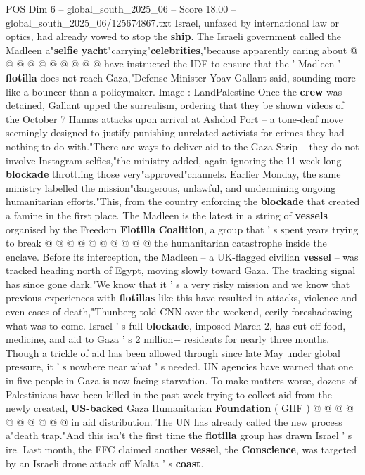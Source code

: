\begin{textsample}{POS Dim 6 – global\_south\_2025\_06 – Score 18.00 – global\_south\_2025\_06/125674867.txt}
Israel, unfazed by international law or optics, had already vowed to stop the \textbf{ship}.
The Israeli government called the Madleen a"\textbf{selfie} \textbf{yacht}"carrying"\textbf{celebrities},"because apparently caring about @ @ @ @ @ @ @ @ @ @ have instructed the IDF to ensure that the ' Madleen ' \textbf{flotilla} does not reach Gaza,"Defense Minister Yoav Gallant said, sounding more like a bouncer than a policymaker.
Image : LandPalestine Once the \textbf{crew} was detained, Gallant upped the surrealism, ordering that they be shown videos of the October 7 Hamas attacks upon arrival at Ashdod Port -- a tone-deaf move seemingly designed to justify punishing unrelated activists for crimes they had nothing to do with."There are ways to deliver aid to the Gaza Strip -- they do not involve Instagram selfies,"the ministry added, again ignoring the 11-week-long \textbf{blockade} throttling those very"approved"channels.
Earlier Monday, the same ministry labelled the mission"dangerous, unlawful, and undermining ongoing humanitarian efforts."This, from the country enforcing the \textbf{blockade} that created a famine in the first place.
The Madleen is the latest in a string of \textbf{vessels} organised by the Freedom \textbf{Flotilla} \textbf{Coalition}, a group that ' s spent years trying to break @ @ @ @ @ @ @ @ @ @ the humanitarian catastrophe inside the enclave.
Before its interception, the Madleen -- a UK-flagged civilian \textbf{vessel} -- was tracked heading north of Egypt, moving slowly toward Gaza.
The tracking signal has since gone dark."We know that it ' s a very risky mission and we know that previous experiences with \textbf{flotillas} like this have resulted in attacks, violence and even cases of death,"Thunberg told CNN over the weekend, eerily foreshadowing what was to come.
Israel ' s full \textbf{blockade}, imposed March 2, has cut off food, medicine, and aid to Gaza ' s 2 million+ residents for nearly three months.
Though a trickle of aid has been allowed through since late May under global pressure, it ' s nowhere near what ' s needed.
UN agencies have warned that one in five people in Gaza is now facing starvation.
To make matters worse, dozens of Palestinians have been killed in the past week trying to collect aid from the newly created, \textbf{US-backed} Gaza Humanitarian \textbf{Foundation} ( GHF ) @ @ @ @ @ @ @ @ @ @ in aid distribution.
The UN has already called the new process a"death trap."And this isn't the first time the \textbf{flotilla} group has drawn Israel ' s ire.
Last month, the FFC claimed another \textbf{vessel}, the \textbf{Conscience}, was targeted by an Israeli drone attack off Malta ' s \textbf{coast}.

\end{textsample}
